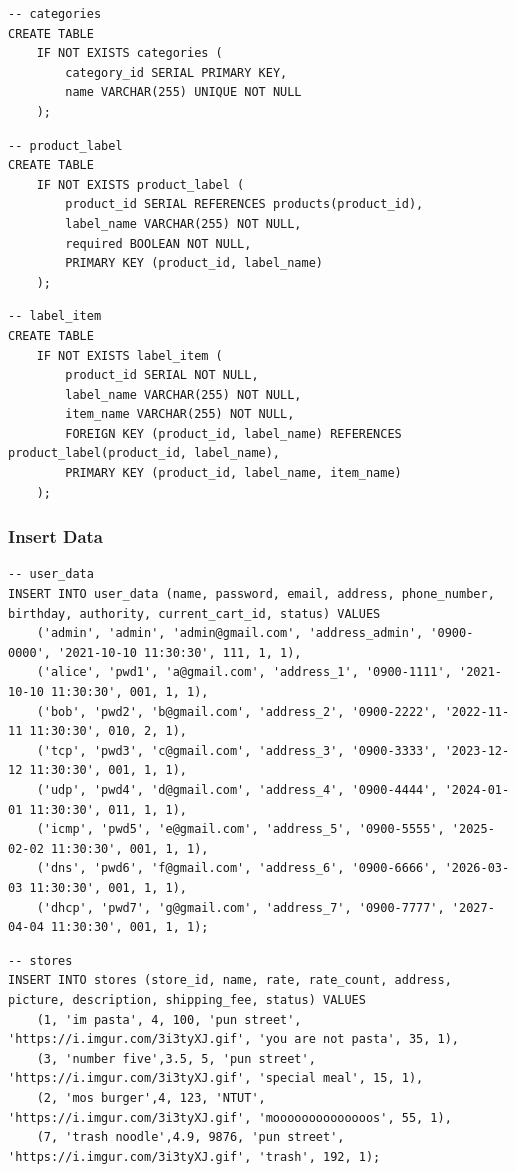 \documentclass[a4paper, 12pt]{article}
\begin{document}
\begin{lstlisting}
-- categories
CREATE TABLE
    IF NOT EXISTS categories (
        category_id SERIAL PRIMARY KEY,
        name VARCHAR(255) UNIQUE NOT NULL
    );
\end{lstlisting}

\begin{lstlisting}
-- product_label
CREATE TABLE
    IF NOT EXISTS product_label (
        product_id SERIAL REFERENCES products(product_id),
        label_name VARCHAR(255) NOT NULL,
        required BOOLEAN NOT NULL,
        PRIMARY KEY (product_id, label_name)
    );
\end{lstlisting}

\begin{lstlisting}
-- label_item
CREATE TABLE
    IF NOT EXISTS label_item (
        product_id SERIAL NOT NULL,
        label_name VARCHAR(255) NOT NULL,
        item_name VARCHAR(255) NOT NULL,
        FOREIGN KEY (product_id, label_name) REFERENCES product_label(product_id, label_name),
        PRIMARY KEY (product_id, label_name, item_name)
    );
\end{lstlisting}

\subsubsection{Insert Data}

\begin{lstlisting}
-- user_data
INSERT INTO user_data (name, password, email, address, phone_number, birthday, authority, current_cart_id, status) VALUES
    ('admin', 'admin', 'admin@gmail.com', 'address_admin', '0900-0000', '2021-10-10 11:30:30', 111, 1, 1),
    ('alice', 'pwd1', 'a@gmail.com', 'address_1', '0900-1111', '2021-10-10 11:30:30', 001, 1, 1),
    ('bob', 'pwd2', 'b@gmail.com', 'address_2', '0900-2222', '2022-11-11 11:30:30', 010, 2, 1),
    ('tcp', 'pwd3', 'c@gmail.com', 'address_3', '0900-3333', '2023-12-12 11:30:30', 001, 1, 1),
    ('udp', 'pwd4', 'd@gmail.com', 'address_4', '0900-4444', '2024-01-01 11:30:30', 011, 1, 1),
    ('icmp', 'pwd5', 'e@gmail.com', 'address_5', '0900-5555', '2025-02-02 11:30:30', 001, 1, 1),
    ('dns', 'pwd6', 'f@gmail.com', 'address_6', '0900-6666', '2026-03-03 11:30:30', 001, 1, 1),
    ('dhcp', 'pwd7', 'g@gmail.com', 'address_7', '0900-7777', '2027-04-04 11:30:30', 001, 1, 1);
\end{lstlisting}

\begin{lstlisting}
-- stores
INSERT INTO stores (store_id, name, rate, rate_count, address, picture, description, shipping_fee, status) VALUES 
    (1, 'im pasta', 4, 100, 'pun street', 'https://i.imgur.com/3i3tyXJ.gif', 'you are not pasta', 35, 1),
    (3, 'number five',3.5, 5, 'pun street', 'https://i.imgur.com/3i3tyXJ.gif', 'special meal', 15, 1),
    (2, 'mos burger',4, 123, 'NTUT', 'https://i.imgur.com/3i3tyXJ.gif', 'moooooooooooooos', 55, 1),
    (7, 'trash noodle',4.9, 9876, 'pun street', 'https://i.imgur.com/3i3tyXJ.gif', 'trash', 192, 1);
\end{lstlisting}
\end{document}
